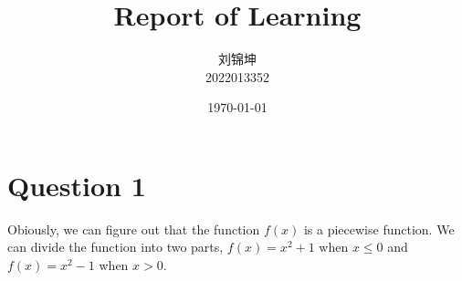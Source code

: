 \documentclass[UTF8]{article}
\title{Report of Learning}
\author{
    刘锦坤
    \\2022013352}
\date{\today}
\begin{document}
\fancyfoot[C]{\thepage}

\maketitle
\tableofcontents

\newpage

\section{Question 1}

Obiously, we can figure out that the function $f(x)$ is a piecewise function. We can divide the function into two parts, $f(x) = x^2 + 1$ when $x \leq 0$ and $f(x) = x^2 - 1$ when $x > 0$.
\end{document}
